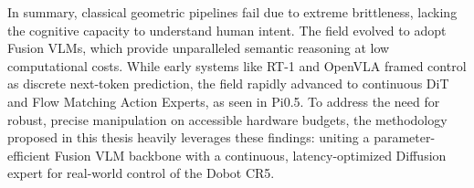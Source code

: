 In summary, classical geometric pipelines fail due to extreme brittleness, lacking the cognitive capacity to understand human intent. The field evolved to adopt Fusion VLMs, which provide unparalleled semantic reasoning at low computational costs. While early systems like RT-1 and OpenVLA framed control as discrete next-token prediction, the field rapidly advanced to continuous DiT and Flow Matching Action Experts, as seen in Pi0.5. To address the need for robust, precise manipulation on accessible hardware budgets, the methodology proposed in this thesis heavily leverages these findings: uniting a parameter-efficient Fusion VLM backbone with a continuous, latency-optimized Diffusion expert for real-world control of the Dobot CR5.

